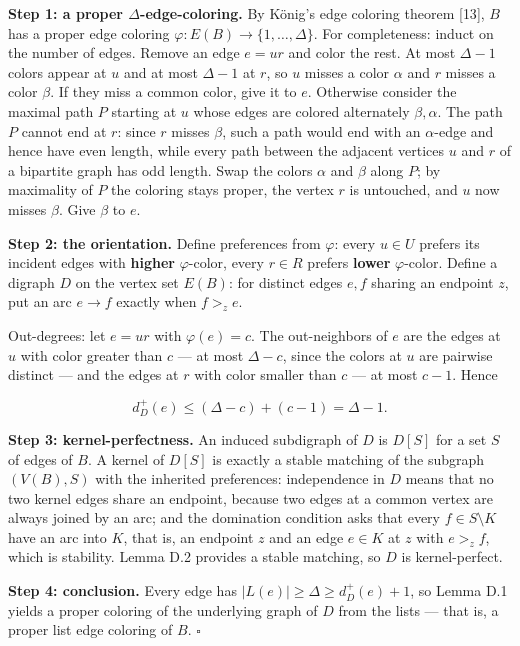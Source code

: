 \documentclass[
  american,
  11pt,
  a4paper,
]{article}
\begin{document}
\textbf{Step 1: a proper \(\Delta\)-edge-coloring.} By König's edge coloring theorem {[}13{]}, \(B\) has a proper edge coloring \(\varphi:E(B)\to\{1,\ldots,\Delta\}\). For completeness: induct on the number of edges. Remove an edge \(e=ur\) and color the rest. At most \(\Delta-1\) colors appear at \(u\) and at most \(\Delta-1\) at \(r\), so \(u\) misses a color \(\alpha\) and \(r\) misses a color \(\beta\). If they miss a common color, give it to \(e\). Otherwise consider the maximal path \(P\) starting at \(u\) whose edges are colored alternately \(\beta,\alpha\). The path \(P\) cannot end at \(r\): since \(r\) misses \(\beta\), such a path would end with an \(\alpha\)-edge and hence have even length, while every path between the adjacent vertices \(u\) and \(r\) of a bipartite graph has odd length. Swap the colors \(\alpha\) and \(\beta\) along \(P\); by maximality of \(P\) the coloring stays proper, the vertex \(r\) is untouched, and \(u\) now misses \(\beta\). Give \(\beta\) to \(e\).

\textbf{Step 2: the orientation.} Define preferences from \(\varphi\): every \(u\in U\) prefers its incident edges with \textbf{higher} \(\varphi\)-color, every \(r\in R\) prefers \textbf{lower} \(\varphi\)-color. Define a digraph \(D\) on the vertex set \(E(B)\): for distinct edges \(e,f\) sharing an endpoint \(z\), put an arc \(e\to f\) exactly when \(f>_ze\).

Out-degrees: let \(e=ur\) with \(\varphi(e)=c\). The out-neighbors of \(e\) are the edges at \(u\) with color greater than \(c\) --- at most \(\Delta-c\), since the colors at \(u\) are pairwise distinct --- and the edges at \(r\) with color smaller than \(c\) --- at most \(c-1\). Hence

\[
d^+_D(e)\le(\Delta-c)+(c-1)=\Delta-1.
\]

\textbf{Step 3: kernel-perfectness.} An induced subdigraph of \(D\) is \(D[S]\) for a set \(S\) of edges of \(B\). A kernel of \(D[S]\) is exactly a stable matching of the subgraph \((V(B),S)\) with the inherited preferences: independence in \(D\) means that no two kernel edges share an endpoint, because two edges at a common vertex are always joined by an arc; and the domination condition asks that every \(f\in S\setminus K\) have an arc into \(K\), that is, an endpoint \(z\) and an edge \(e\in K\) at \(z\) with \(e>_zf\), which is stability. Lemma D.2 provides a stable matching, so \(D\) is kernel-perfect.

\textbf{Step 4: conclusion.} Every edge has \(|L(e)|\ge\Delta\ge d^+_D(e)+1\), so Lemma D.1 yields a proper coloring of the underlying graph of \(D\) from the lists --- that is, a proper list edge coloring of \(B\). \(\square\)
\end{document}

